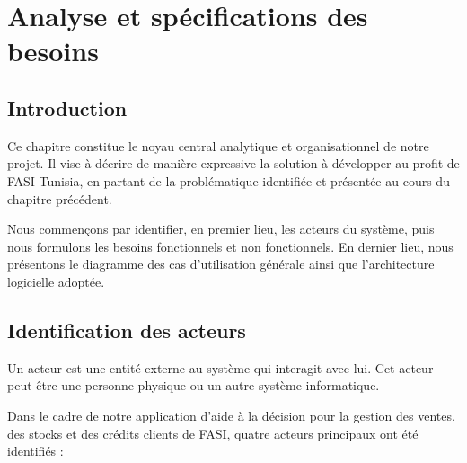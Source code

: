 \documentclass[a4paper,12pt]{report}
\begin{document}

\chapter{Analyse et spécifications des besoins}

\section{Introduction}

Ce chapitre constitue le noyau central analytique et organisationnel de notre projet. Il vise à décrire de manière expressive la solution à développer au profit de FASI Tunisia, en partant de la problématique identifiée et présentée au cours du chapitre précédent.

Nous commençons par identifier, en premier lieu, les acteurs du système, puis nous formulons les besoins fonctionnels et non fonctionnels. En dernier lieu, nous présentons le diagramme des cas d'utilisation générale ainsi que l'architecture logicielle adoptée.

\section{Identification des acteurs}

Un acteur est une entité externe au système qui interagit avec lui. Cet acteur peut être une personne physique ou un autre système informatique.

Dans le cadre de notre application d'aide à la décision pour la gestion des ventes, des stocks et des crédits clients de FASI, quatre acteurs principaux ont été identifiés :
\end{document}
